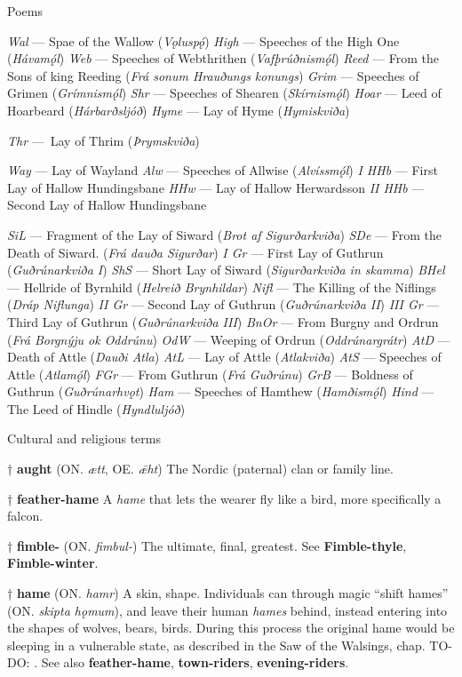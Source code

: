 Poems

\emph{Wal} — Spae of the Wallow (\emph{Vǫluspǫ́})
\emph{High} — Speeches of the High One (\emph{Hávamǫ́l})
\emph{Web} — Speeches of Webthrithen (\emph{Vafþrúðnismǫ́l})
\emph{Reed} — From the Sons of king Reeding (\emph{Frá sonum Hrauðungs konungs})
\emph{Grim} — Speeches of Grimen (\emph{Grímnismǫ́l})
\emph{Shr} — Speeches of Shearen (\emph{Skírnismǫ́l})
\emph{Hoar} — Leed of Hoarbeard (\emph{Hárbarðsljóð})
\emph{Hyme} — Lay of Hyme (\emph{Hymiskviða})

\emph{Thr} — Lay of Thrim (\emph{Þrymskviða})

\emph{Way} — Lay of Wayland
\emph{Alw} — Speeches of Allwise (\emph{Alvíssmǫ́l})
\emph{I HHb} — First Lay of Hallow Hundingsbane
\emph{HHw} — Lay of Hallow Herwardsson
\emph{II HHb} — Second Lay of Hallow Hundingsbane

\emph{SiL} — Fragment of the Lay of Siward (\emph{Brot af Sigurðarkviða})
\emph{SDe} — From the Death of Siward. (\emph{Frá dauða Sigurðar})
\emph{I Gr} — First Lay of Guthrun (\emph{Guðrúnarkviða I})
\emph{ShS} — Short Lay of Siward (\emph{Sigurðarkviða in skamma})
\emph{BHel} — Hellride of Byrnhild (\emph{Helreið Brynhildar})
\emph{Nifl} — The Killing of the Niflings (\emph{Dráp Niflunga})
\emph{II Gr} — Second Lay of Guthrun (\emph{Guðrúnarkviða II})
\emph{III Gr} — Third Lay of Guthrun (\emph{Guðrúnarkviða III})
\emph{BnOr} — From Burgny and Ordrun (\emph{Frá Borgnýju ok Oddrúnu})
\emph{OdW} — Weeping of Ordrun (\emph{Oddrúnargrátr})
\emph{AtD} — Death of Attle (\emph{Dauði Atla})
\emph{AtL} — Lay of Attle (\emph{Atlakviða})
\emph{AtS} — Speeches of Attle (\emph{Atlamǫ́l})
\emph{FGr} — From Guthrun (\emph{Frá Guðrúnu})
\emph{GrB} — Boldness of Guthrun (\emph{Guðrúnarhvǫt})
\emph{Ham} — Speeches of Hamthew (\emph{Hamðismǫ́l})
\emph{Hind} — The Leed of Hindle (\emph{Hyndluljóð})



Cultural and religious terms

† \textbf{aught} (ON. \emph{ætt}, OE. \emph{ǣht})
 The Nordic (paternal) clan or family line.

† \textbf{feather-hame}
 A \emph{hame} that lets the wearer fly like a bird, more specifically a falcon.

† \textbf{fimble-} (ON. \emph{fimbul-})
 The ultimate, final, greatest. See \textbf{Fimble-thyle}, \textbf{Fimble-winter}.

† \textbf{hame} (ON. \emph{hamr})
 A skin, shape. Individuals can through magic “shift hames” (ON. \emph{skipta hǫmum}), and leave their human \emph{hames} behind, instead entering into the shapes of wolves, bears, birds. During this process the original hame would be sleeping in a vulnerable state, as described in the Saw of the Walsings, chap. TO-DO: . See also \textbf{feather-hame}, \textbf{town-riders}, \textbf{evening-riders}.

